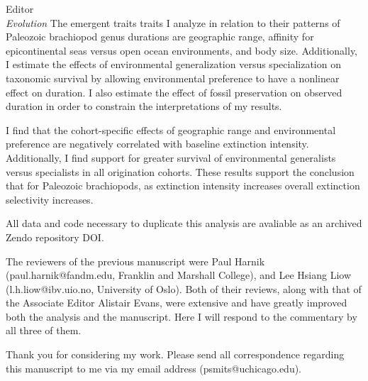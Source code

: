 \documentclass{letter}
\begin{document}
\begin{letter}{Editor \\ \textit{Evolution}}
  The emergent traits traits I analyze in relation to their patterns of Paleozoic brachiopod genus durations are geographic range, affinity for epicontinental seas versus open ocean environments, and body size. Additionally, I estimate the effects of environmental generalization versus specialization on taxonomic survival by allowing environmental preference to have a nonlinear effect on duration. I also estimate the effect of fossil preservation on observed duration in order to constrain the interpretations of my results. 
  
  I find that the cohort-specific effects of geographic range and environmental preference are negatively correlated with baseline extinction intensity. Additionally, I find support for greater survival of environmental generalists versus specialists in all origination cohorts. These results support the conclusion that for Paleozoic brachiopods, as extinction intensity increases overall extinction selectivity increases.

  All data and code necessary to duplicate this analysis are avaliable as an archived Zendo repository DOI.

  The reviewers of the previous manuscript were Paul Harnik (paul.harnik@fandm.edu, Franklin and Marshall College), and Lee Hsiang Liow (l.h.liow@ibv.uio.no, University of Oslo). Both of their reviews, along with that of the Associate Editor Alistair Evans, were extensive and have greatly improved both the analysis and the manuscript. Here I will respond to the commentary by all three of them.
  
  Thank you for considering my work. Please send all correspondence regarding this manuscript to me via my email address (psmits@uchicago.edu).


  \clearpage


\end{letter}
\end{document}
